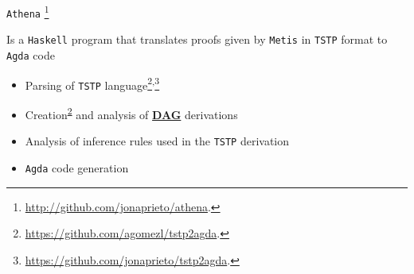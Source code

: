 \documentclass[10pt, xetex, hyperref={pdfpagelabels=false}]{beamer}
\begin{document}
\begin{frame}[fragile, label=athena]{\texttt{Athena}
  \footnote{\url{http://github.com/jonaprieto/athena}.}}


Is a \texttt{Haskell} program
that translates proofs given by \texttt{Metis}
in \texttt{TSTP} format to \texttt{Agda} code\\

\begin{itemize}
    \item Parsing of \texttt{TSTP} language\footnote{\label{parsing}\url{https://github.com/agomezl/tstp2agda}.}\textsuperscript{,}\footnote{\url{https://github.com/jonaprieto/tstp2agda}.}
    \item Creation\textsuperscript{\ref{parsing}} and analysis of \hyperlink{tstp-dag}{\textbf{DAG}} derivations
    \item Analysis of inference rules used in the \texttt{TSTP} derivation
    \item \texttt{Agda} code generation
\begin{table}[!ht]
\begin{center}
\end{center}
\label{tab:library}
\end{table}

\end{itemize}
\end{frame}
\end{document}
